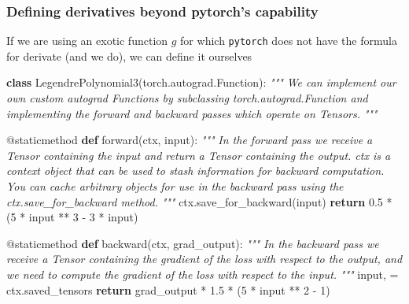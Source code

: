 \documentclass[
]{article}
\newenvironment{Shaded}{}{}
\newcommand{\AttributeTok}[1]{\textcolor[rgb]{0.49,0.56,0.16}{#1}}
\newcommand{\BuiltInTok}[1]{\textcolor[rgb]{0.00,0.50,0.00}{#1}}
\newcommand{\CommentTok}[1]{\textcolor[rgb]{0.38,0.63,0.69}{\textit{#1}}}
\newcommand{\ControlFlowTok}[1]{\textcolor[rgb]{0.00,0.44,0.13}{\textbf{#1}}}
\newcommand{\DecValTok}[1]{\textcolor[rgb]{0.25,0.63,0.44}{#1}}
\newcommand{\FloatTok}[1]{\textcolor[rgb]{0.25,0.63,0.44}{#1}}
\newcommand{\KeywordTok}[1]{\textcolor[rgb]{0.00,0.44,0.13}{\textbf{#1}}}
\newcommand{\NormalTok}[1]{#1}
\newcommand{\OperatorTok}[1]{\textcolor[rgb]{0.40,0.40,0.40}{#1}}
\begin{document}
\hypertarget{defining-derivatives-beyond-pytorchs-capability}{%
\subsubsection{Defining derivatives beyond pytorch's
capability}\label{defining-derivatives-beyond-pytorchs-capability}}

If we are using an exotic function \(g\) for which \texttt{pytorch} does
not have the formula for derivate (and we do), we can define it
ourselves

\begin{Shaded}
\begin{Highlighting}[]
\KeywordTok{class}\NormalTok{ LegendrePolynomial3(torch.autograd.Function):}
    \CommentTok{"""}
\CommentTok{    We can implement our own custom autograd Functions by subclassing}
\CommentTok{    torch.autograd.Function and implementing the forward and backward passes}
\CommentTok{    which operate on Tensors.}
\CommentTok{    """}

    \AttributeTok{@staticmethod}
    \KeywordTok{def}\NormalTok{ forward(ctx, }\BuiltInTok{input}\NormalTok{):}
        \CommentTok{"""}
\CommentTok{        In the forward pass we receive a Tensor containing the input and return}
\CommentTok{        a Tensor containing the output. ctx is a context object that can be used}
\CommentTok{        to stash information for backward computation. You can cache arbitrary}
\CommentTok{        objects for use in the backward pass using the ctx.save\_for\_backward method.}
\CommentTok{        """}
\NormalTok{        ctx.save\_for\_backward(}\BuiltInTok{input}\NormalTok{)}
        \ControlFlowTok{return} \FloatTok{0.5} \OperatorTok{*}\NormalTok{ (}\DecValTok{5} \OperatorTok{*} \BuiltInTok{input} \OperatorTok{**} \DecValTok{3} \OperatorTok{{-}} \DecValTok{3} \OperatorTok{*} \BuiltInTok{input}\NormalTok{)}

    \AttributeTok{@staticmethod}
    \KeywordTok{def}\NormalTok{ backward(ctx, grad\_output):}
        \CommentTok{"""}
\CommentTok{        In the backward pass we receive a Tensor containing the gradient of the loss}
\CommentTok{        with respect to the output, and we need to compute the gradient of the loss}
\CommentTok{        with respect to the input.}
\CommentTok{        """}
        \BuiltInTok{input}\NormalTok{, }\OperatorTok{=}\NormalTok{ ctx.saved\_tensors}
        \ControlFlowTok{return}\NormalTok{ grad\_output }\OperatorTok{*} \FloatTok{1.5} \OperatorTok{*}\NormalTok{ (}\DecValTok{5} \OperatorTok{*} \BuiltInTok{input} \OperatorTok{**} \DecValTok{2} \OperatorTok{{-}} \DecValTok{1}\NormalTok{)}
\end{Highlighting}
\end{Shaded}
\end{document}
